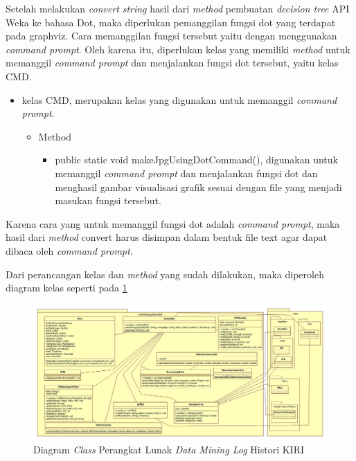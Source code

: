 Setelah melakukan \textsl{convert} \textsl{string} hasil dari \textsl{method} pembuatan \textsl{decision tree} API Weka ke bahasa Dot, maka diperlukan pemanggilan fungsi dot yang terdapat pada graphviz. Cara memanggilan fungsi tersebut yaitu dengan menggunakan \textsl{command prompt}. Oleh karena itu, diperlukan kelas yang memiliki \textsl{method} untuk memanggil \textsl{command prompt} dan menjalankan fungsi dot tersebut, yaitu kelas CMD.


\begin{itemize}
	\item kelas CMD, merupakan kelas yang digunakan untuk memanggil \textsl{command prompt}.
	\begin{itemize}
		\item Method
		\begin{itemize}
			\item public static void makeJpgUsingDotCommand(), digunakan untuk memanggil \textsl{command prompt} dan menjalankan fungsi dot dan menghasil gambar visualisasi grafik sesuai dengan file yang menjadi masukan fungsi tersebut.
		\end{itemize}
	\end{itemize}
\end{itemize}

Karena cara yang untuk memanggil fungsi dot adalah \textsl{command prompt}, maka hasil dari \textsl{method} convert harus disimpan dalam bentuk file text agar dapat dibaca oleh \textsl{command prompt}.

Dari perancangan kelas dan \textsl{method} yang sudah dilakukan, maka diperoleh diagram kelas seperti pada \ref{fig:classDiagram2}

\begin{figure}[ht]
\includegraphics[scale=0.45, angle =90]{Gambar/classdiagram2.jpg}
\caption[Diagram \textsl{Class} Perangkat Lunak \textsl{Data Mining Log} Histori KIRI]{Diagram \textsl{Class} Perangkat Lunak \textsl{Data Mining Log} Histori KIRI} 
\label{fig:classDiagram2}
\end{figure}

